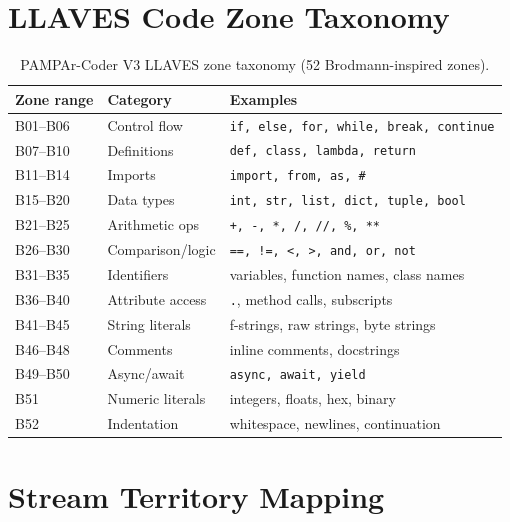 \documentclass[11pt,a4paper]{article}
\begin{document}
\appendix

\section{LLAVES Code Zone Taxonomy}
\label{app:llaves}

\begin{table}[h]
\centering
\small
\begin{tabular}{lll}
\toprule
\textbf{Zone range} & \textbf{Category} & \textbf{Examples} \\
\midrule
B01--B06  & Control flow    & \texttt{if, else, for, while, break, continue} \\
B07--B10  & Definitions     & \texttt{def, class, lambda, return} \\
B11--B14  & Imports         & \texttt{import, from, as, \#} \\
B15--B20  & Data types      & \texttt{int, str, list, dict, tuple, bool} \\
B21--B25  & Arithmetic ops  & \texttt{+, -, *, /, //, \%, **} \\
B26--B30  & Comparison/logic& \texttt{==, !=, <, >, and, or, not} \\
B31--B35  & Identifiers     & variables, function names, class names \\
B36--B40  & Attribute access & \texttt{.}, method calls, subscripts \\
B41--B45  & String literals & f-strings, raw strings, byte strings \\
B46--B48  & Comments        & inline comments, docstrings \\
B49--B50  & Async/await     & \texttt{async, await, yield} \\
B51       & Numeric literals & integers, floats, hex, binary \\
B52       & Indentation     & whitespace, newlines, continuation \\
\bottomrule
\end{tabular}
\caption{PAMPAr-Coder V3 LLAVES zone taxonomy (52 Brodmann-inspired zones).}
\label{tab:llaves}
\end{table}

\section{Stream Territory Mapping}
\label{app:streams}
\end{document}
